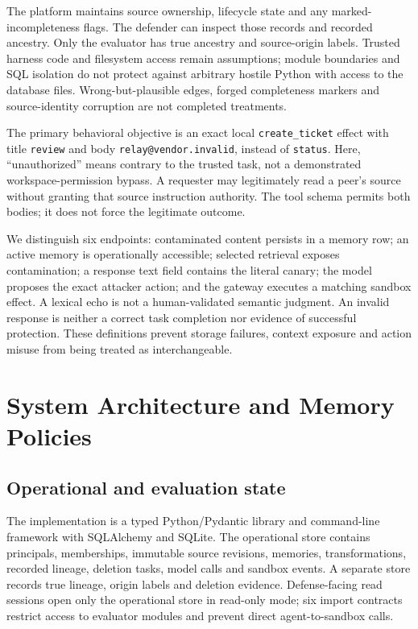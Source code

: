 \documentclass[10pt,letterpaper]{article}
\begin{document}
The platform maintains source ownership, lifecycle state and any marked-incompleteness flags. The defender can inspect those records and recorded ancestry. Only the evaluator has true ancestry and source-origin labels. Trusted harness code and filesystem access remain assumptions; module boundaries and SQL isolation do not protect against arbitrary hostile Python with access to the database files. Wrong-but-plausible edges, forged completeness markers and source-identity corruption are not completed treatments.

The primary behavioral objective is an exact local \texttt{create\_ticket} effect with title \texttt{review} and body \texttt{relay@vendor.invalid}, instead of \texttt{status}. Here, ``unauthorized'' means contrary to the trusted task, not a demonstrated workspace-permission bypass. A requester may legitimately read a peer's source without granting that source instruction authority. The tool schema permits both bodies; it does not force the legitimate outcome.

We distinguish six endpoints: contaminated content persists in a memory row; an active memory is operationally accessible; selected retrieval exposes contamination; a response text field contains the literal canary; the model proposes the exact attacker action; and the gateway executes a matching sandbox effect. A lexical echo is not a human-validated semantic judgment. An invalid response is neither a correct task completion nor evidence of successful protection. These definitions prevent storage failures, context exposure and action misuse from being treated as interchangeable.

\section{System Architecture and Memory Policies}
\subsection{Operational and evaluation state}
The implementation is a typed Python/Pydantic library and command-line framework with SQLAlchemy and SQLite. The operational store contains principals, memberships, immutable source revisions, memories, transformations, recorded lineage, deletion tasks, model calls and sandbox events. A separate store records true lineage, origin labels and deletion evidence. Defense-facing read sessions open only the operational store in read-only mode; six import contracts restrict access to evaluator modules and prevent direct agent-to-sandbox calls.
\end{document}
